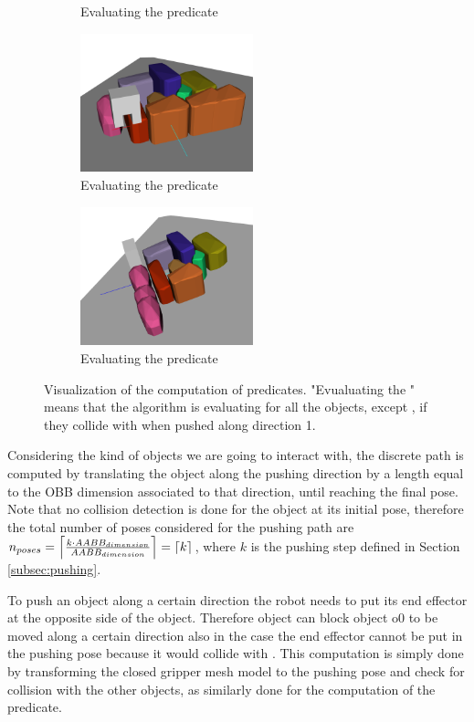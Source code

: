 \begin{figure}[h]
\begin{subfigure}[t]{5cm}
\caption{Evaluating the  predicate}\label{fig:block_dir_original}
\end{subfigure}
\begin{subfigure}[t]{5cm}
\centering
\includegraphics[width=5cm]{Img/block_dir/pushing44.png}
\caption{Evaluating the  predicate}\label{fig:block_dir_original}
\end{subfigure}
\begin{subfigure}[t]{5cm}
\centering
\includegraphics[width=5cm]{Img/block_dir/pushing55.png}
\caption{Evaluating the  predicate}\label{fig:block_dir_original}
\end{subfigure}
\caption{Visualization of the computation of  predicates. "Evualuating the " means that the algorithm is evaluating for all the objects, except , if they collide with  when pushed along direction 1.}\label{fig:block_dir}
\end{figure}

Considering the kind of objects we are going to interact with, the discrete path  is computed by translating the object along the pushing direction by a length equal to the OBB dimension associated to that direction, until reaching the final pose. Note that no collision detection is done for the object at its initial pose, therefore the total number of poses considered for the pushing path are $n_{poses} = \ceil*{\frac{k \cdot AABB_{dimension}}{AABB_{dimension}}} = \ceil*{k}$, where $k$ is the pushing step defined in Section \ref{subsec:pushing}.

To push an object along a certain direction the robot needs to put its end effector at the opposite side of the object. Therefore object  can block object {o0} to be moved along a certain direction also in the case the end effector cannot be put in the pushing pose because it would collide with . This computation is simply done by transforming the closed gripper mesh model to the pushing pose and check for collision with the other objects, as similarly done for the computation of the  predicate.

